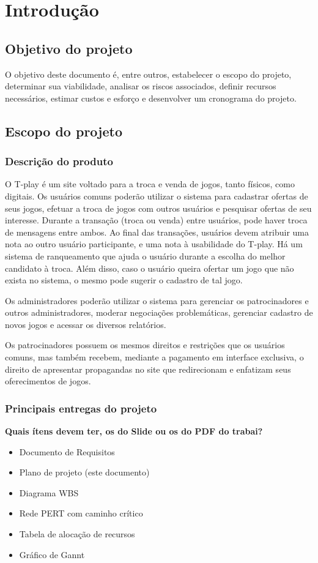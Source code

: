 \documentclass[a4paper,11pt]{article}
\newcommand{\DUVIDA}[1]{\huge \textbf {\color{red} #1}\normalsize \\} %
\begin{document}
\tableofcontents
\newpage

\section{Introdução}
	\subsection{Objetivo do projeto}
		O objetivo deste documento é, entre outros, estabelecer o escopo do projeto, determinar sua viabilidade, analisar os riscos associados, definir recursos necessários, estimar custos e esforço e desenvolver um cronograma do projeto.

	\subsection{Escopo do projeto}
		\subsubsection{Descrição do produto}
			O T-play é  um site voltado para a troca e venda de jogos, tanto físicos, como digitais.
			Os usuários comuns poderão utilizar o sistema para cadastrar ofertas de seus jogos, efetuar a troca de jogos com outros usuários e 
pesquisar ofertas de seu interesse.
			Durante a transação (troca ou venda) entre usuários, pode haver troca de mensagens entre ambos.
			Ao final das transações, usuários devem atribuir uma nota ao outro usuário participante, e uma nota à usabilidade do T-play.
			Há um sistema de ranqueamento que ajuda o usuário durante a escolha do melhor candidato à troca.
			Além disso, caso o usuário queira ofertar um jogo que não exista no sistema, o mesmo pode sugerir o cadastro de tal jogo.
			
			Os administradores poderão utilizar o sistema para gerenciar os patrocinadores e outros administradores, moderar negociações problemáticas, gerenciar cadastro de novos jogos e acessar os diversos relatórios.

			Os patrocinadores possuem os mesmos direitos e restrições que os usuários comuns, mas também recebem, mediante a pagamento em interface exclusiva, o direito de apresentar propagandas no site que redirecionam e enfatizam seus oferecimentos de jogos.

		\subsubsection{Principais entregas do projeto}
			\DUVIDA{Quais ítens devem ter, os do Slide ou os do PDF do trabai?}
			\begin{itemize}
				\item Documento de Requisitos
				\item Plano de projeto (este documento)
				\item Diagrama WBS
				\item Rede PERT com caminho crítico
				\item Tabela de alocação de recursos
				\item Gráfico de Gannt
			\end{itemize}
\end{document}

